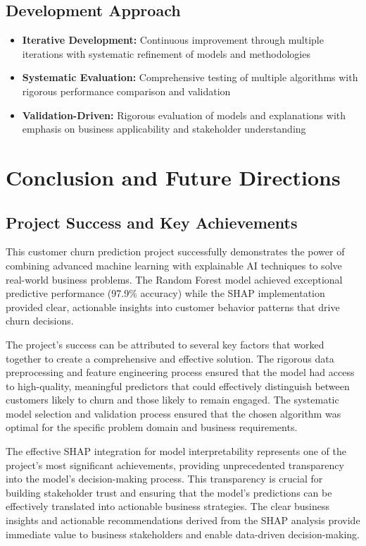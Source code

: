 \documentclass{article}
\begin{document}
\subsection{Development Approach}
\begin{itemize}
    \item \textbf{Iterative Development:} Continuous improvement through multiple iterations with systematic refinement of models and methodologies
    \item \textbf{Systematic Evaluation:} Comprehensive testing of multiple algorithms with rigorous performance comparison and validation
    \item \textbf{Validation-Driven:} Rigorous evaluation of models and explanations with emphasis on business applicability and stakeholder understanding
\end{itemize}

\section{Conclusion and Future Directions}

\subsection{Project Success and Key Achievements}

This customer churn prediction project successfully demonstrates the power of combining advanced machine learning with explainable AI techniques to solve real-world business problems. The Random Forest model achieved exceptional predictive performance (97.9\% accuracy) while the SHAP implementation provided clear, actionable insights into customer behavior patterns that drive churn decisions.

The project's success can be attributed to several key factors that worked together to create a comprehensive and effective solution. The rigorous data preprocessing and feature engineering process ensured that the model had access to high-quality, meaningful predictors that could effectively distinguish between customers likely to churn and those likely to remain engaged. The systematic model selection and validation process ensured that the chosen algorithm was optimal for the specific problem domain and business requirements.

The effective SHAP integration for model interpretability represents one of the project's most significant achievements, providing unprecedented transparency into the model's decision-making process. This transparency is crucial for building stakeholder trust and ensuring that the model's predictions can be effectively translated into actionable business strategies. The clear business insights and actionable recommendations derived from the SHAP analysis provide immediate value to business stakeholders and enable data-driven decision-making.
\end{document}
